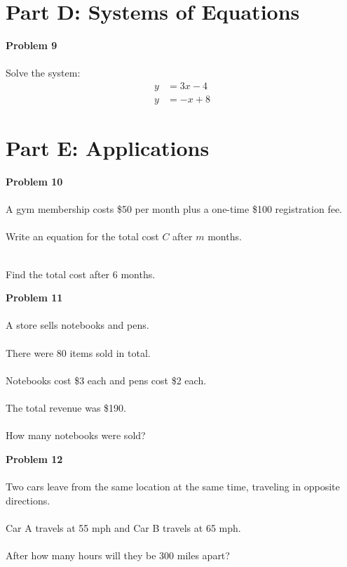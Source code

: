 \documentclass[12pt]{article}
\begin{document}
        \section*{Part D: Systems of Equations}

            \textbf{Problem 9}\\\\
            Solve the system:
            \begin{align*}
                y &= 3x - 4\\
                y &= -x + 8
            \end{align*}

            \newpage

        \section*{Part E: Applications}

            \textbf{Problem 10}\\\\
            A gym membership costs \$50 per month plus a one-time \$100 registration fee.\\\\
            Write an equation for the total cost $C$ after $m$ months.\\\\

            \vspace{2cm}

            Find the total cost after 6 months.

            \vspace{3cm}

            \textbf{Problem 11}\\\\
            A store sells notebooks and pens.\\\\
            There were 80 items sold in total.\\\\
            Notebooks cost \$3 each and pens cost \$2 each.\\\\
            The total revenue was \$190.\\\\
            How many notebooks were sold?

            \newpage

            \textbf{Problem 12}\\\\
            Two cars leave from the same location at the same time, traveling in opposite directions.\\\\
            Car A travels at 55 mph and Car B travels at 65 mph.\\\\
            After how many hours will they be 300 miles apart?
\end{document}
